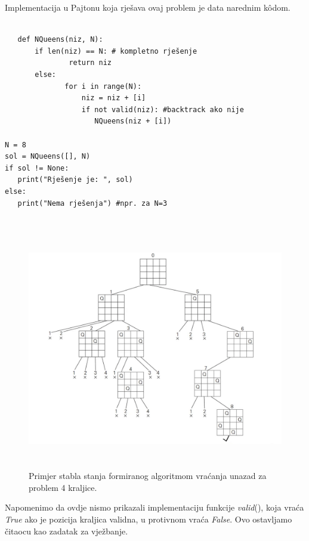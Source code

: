 \begin{solution}
   
Implementacija u Pajtonu koja rješava ovaj problem je data narednim k\^odom. 

\begin{verbatim}
	
   def NQueens(niz, N):
       if len(niz) == N: # kompletno rješenje
               return niz
       else:
              for i in range(N):
                  niz = niz + [i]
                  if not valid(niz): #backtrack ako nije 
                     NQueens(niz + [i])

N = 8
sol = NQueens([], N)       
if sol != None:
   print("Rješenje je: ", sol)
else:
   print("Nema rješenja") #npr. za N=3
   
\end{verbatim}
\begin{figure}
	\centering
	\includegraphics[width=450pt, height=300pt]{slike/n-queen-backtracking.png} %
	\caption{Primjer stabla stanja formiranog algoritmom vraćanja unazad za problem 4 kraljice.}
\end{figure}

Napomenimo da ovdje nismo prikazali implementaciju funkcije \textit{valid}(), koja vraća \textit{True} ako je pozicija kraljica  validna, u protivnom vraća \textit{False}. Ovo ostavljamo čitaocu kao zadatak za vježbanje. 


\end{solution}


